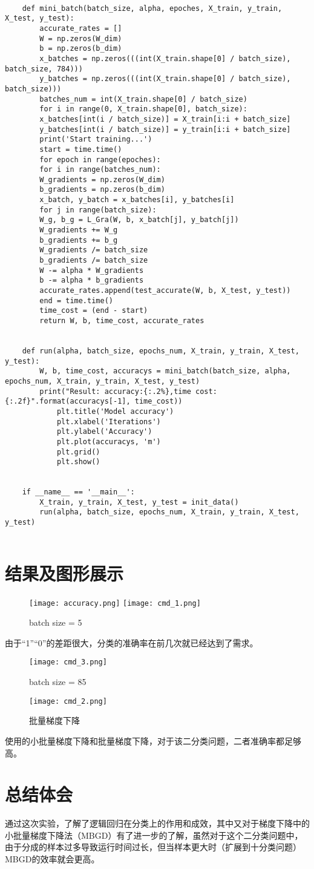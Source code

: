 \documentclass[lang=cn,12pt,a4paper,cite=authoryear]{elegantpaper}
\begin{document}
\begin{lstlisting}
	
	def mini_batch(batch_size, alpha, epoches, X_train, y_train, X_test, y_test):
		accurate_rates = []
		W = np.zeros(W_dim)
		b = np.zeros(b_dim)
		x_batches = np.zeros(((int(X_train.shape[0] / batch_size), batch_size, 784)))
		y_batches = np.zeros(((int(X_train.shape[0] / batch_size), batch_size)))
		batches_num = int(X_train.shape[0] / batch_size)
		for i in range(0, X_train.shape[0], batch_size):
		x_batches[int(i / batch_size)] = X_train[i:i + batch_size]
		y_batches[int(i / batch_size)] = y_train[i:i + batch_size]
		print('Start training...')
		start = time.time()
		for epoch in range(epoches):
		for i in range(batches_num):
		W_gradients = np.zeros(W_dim)
		b_gradients = np.zeros(b_dim)
		x_batch, y_batch = x_batches[i], y_batches[i]
		for j in range(batch_size):
		W_g, b_g = L_Gra(W, b, x_batch[j], y_batch[j])
		W_gradients += W_g
		b_gradients += b_g
		W_gradients /= batch_size
		b_gradients /= batch_size
		W -= alpha * W_gradients
		b -= alpha * b_gradients
		accurate_rates.append(test_accurate(W, b, X_test, y_test))
		end = time.time()
		time_cost = (end - start)
		return W, b, time_cost, accurate_rates
	
	
	def run(alpha, batch_size, epochs_num, X_train, y_train, X_test, y_test):
		W, b, time_cost, accuracys = mini_batch(batch_size, alpha, epochs_num, X_train, y_train, X_test, y_test)
		print("Result: accuracy:{:.2%},time cost:{:.2f}".format(accuracys[-1], time_cost))
			plt.title('Model accuracy')
			plt.xlabel('Iterations')
			plt.ylabel('Accuracy')
			plt.plot(accuracys, 'm')
			plt.grid()
			plt.show()
			
			
	if __name__ == '__main__':
		X_train, y_train, X_test, y_test = init_data()
		run(alpha, batch_size, epochs_num, X_train, y_train, X_test, y_test)
		
\end{lstlisting}
\section{结果及图形展示}
\begin{figure}[htbp]
	\centering
	\texttt{[image: accuracy.png]}
	\texttt{[image: cmd\_1.png]}
	\caption{batch size = 5}
\end{figure}
由于“1”“0”的差距很大，分类的准确率在前几次就已经达到了需求。
\begin{figure}[htbp]
	\centering
	\texttt{[image: cmd\_3.png]}
	\caption{batch size = 85}
\end{figure}
\begin{figure}[htbp]
	\centering
	\texttt{[image: cmd\_2.png]}
	\caption{批量梯度下降}
\end{figure}

使用的小批量梯度下降和批量梯度下降，对于该二分类问题，二者准确率都足够高。
\section{总结体会}
通过这次实验，了解了逻辑回归在分类上的作用和成效，其中又对于梯度下降中的小批量梯度下降法（MBGD）有了进一步的了解，虽然对于这个二分类问题中，由于分成的样本过多导致运行时间过长，但当样本更大时（扩展到十分类问题）MBGD的效率就会更高。
\end{document}
